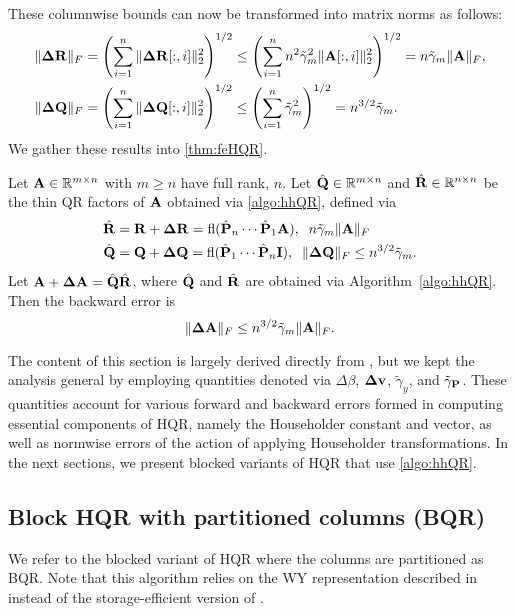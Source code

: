 These columnwise bounds can now be transformed into matrix norms as follows: 
\begin{align*}
	\|\mathbf{\Delta R} \|_F &= \left(\sum_{i=1}^n \|\mathbf{\Delta R}[:,i]\|_2^2\right)^{1/2} \leq \left(\sum_{i=1}^n n^2\tilde{\gamma}_{m}^2 \|\mathbf{A}[:,i]\|_2^2\right)^{1/2} = n\tilde{\gamma}_{m} \|\mathbf{A}\|_F, \\
	\|\mathbf{\Delta Q} \|_F &= \left(\sum_{i=1}^n \|\mathbf{\Delta Q}[:,i]\|_2^2\right)^{1/2} \leq \left(\sum_{i=1}^n \tilde{\gamma}_{m}^2 \right)^{1/2} = n^{3/2}\tilde{\gamma}_{m}.
\end{align*}
We gather these results into \cref{thm:feHQR}.
\begin{theorem}
	\label{thm:feHQR}
	Let $\mathbf{A}\in\mathbb{R}^{m\times n}$ with $m\geq n$ have full rank, $n$. 
	Let $\hat{\mathbf{Q}}\in\mathbb{R}^{m\times n}$ and $\hat{\mathbf{R}}\in\mathbb{R}^{n\times n}$ be the thin QR factors of $\mathbf{A}$ obtained via \cref{algo:hhQR}, defined via 
	\begin{align*}
	\hat{\mathbf{R}} &= \mathbf{R} + \mathbf{\Delta R} = \mathrm{fl}(\hat{\mathbf{P}}_n\cdots\hat{\mathbf{P}}_1 \mathbf{A}),\;\; n\tilde{\gamma}_{m} \|\mathbf{A}\|_F\\
	\hat{\mathbf{Q}} &= \mathbf{Q} + \mathbf{\Delta Q} = \mathrm{fl}(\hat{\mathbf{P}}_1\cdots\hat{\mathbf{P}}_n \mathbf{I}),\;\; \|\mathbf{\Delta Q}\|_F \leq n^{3/2} \tilde{\gamma}_{m}.
	\end{align*}
	Let $\mathbf{A}+\mathbf{\Delta A} = \hat{\mathbf{Q}}\hat{\mathbf{R}}$, where $\hat{\mathbf{Q}}$ and $\hat{\mathbf{R}}$ are obtained via Algorithm~\ref{algo:hhQR}.
	Then the backward error is
	\begin{equation}
	\|\mathbf{\Delta A}\|_F \leq n^{3/2}\tilde{\gamma}_{m}\|\mathbf{A}\|_F.
	\end{equation}
\end{theorem}

The content of this section is largely derived directly from \cite{Higham2002}, but we kept the analysis general by employing quantities denoted via $\Delta \beta$, $\mathbf{\Delta v}$, $\tilde{\gamma}_y$, and $\tilde{\gamma}_{\mathbf{P}}$. 
These quantities account for various forward and backward errors formed in computing essential components of HQR, namely the Householder constant and vector, as well as normwise errors of the action of applying Householder transformations.
In the next sections, we present blocked variants of HQR that use \cref{algo:hhQR}.
\subsection{Block HQR with partitioned columns (BQR)}\label{sec:BQR}
We refer to the blocked variant of HQR where the columns are partitioned as BQR. 
Note that this algorithm relies on the WY representation described in \cite{Bischof1987} instead of the storage-efficient version of \cite{Schreiber1989}.

